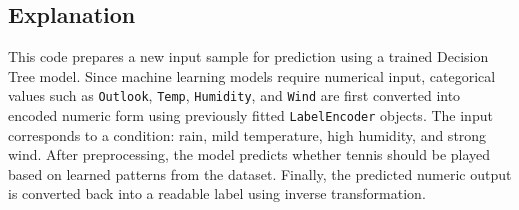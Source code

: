 \documentclass[11pt,a4paper]{report}
\begin{document}
\subsection*{Explanation}
This code prepares a new input sample for prediction using a trained Decision Tree model. Since machine learning models require numerical input, categorical values such as \texttt{Outlook}, \texttt{Temp}, \texttt{Humidity}, and \texttt{Wind} are first converted into encoded numeric form using previously fitted \texttt{LabelEncoder} objects. The input corresponds to a condition: rain, mild temperature, high humidity, and strong wind. After preprocessing, the model predicts whether tennis should be played based on learned patterns from the dataset. Finally, the predicted numeric output is converted back into a readable label using inverse transformation.
\end{document}
